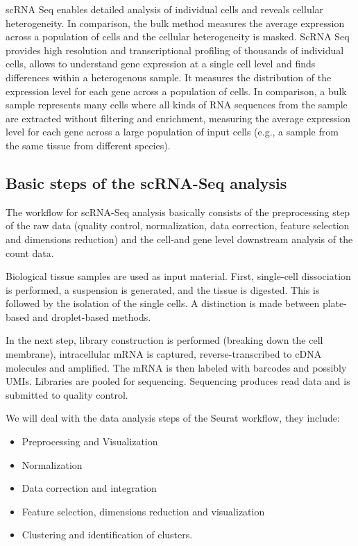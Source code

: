 \documentclass[a4paper, 10pt]{scrartcl}
\providecommand{\tightlist}{%
  \setlength{\itemsep}{0pt}\setlength{\parskip}{0pt}}
\begin{document}
scRNA Seq enables detailed analysis of individual cells and reveals
cellular heterogeneity. In comparison, the bulk method measures the
average expression across a population of cells and the cellular
heterogeneity is masked. ScRNA Seq provides high resolution and
transcriptional profiling of thousands of individual cells, allows to
understand gene expression at a single cell level and finds differences
within a heterogenous sample. It measures the distribution of the
expression level for each gene across a population of cells. In
comparison, a bulk sample represents many cells where all kinds of RNA
sequences from the sample are extracted without filtering and
enrichment, measuring the average expression level for each gene across
a large population of input cells (e.g., a sample from the same tissue
from different species).

\hypertarget{basic-steps-of-the-scrna-seq-analysis}{%
\subsection{Basic steps of the scRNA-Seq
analysis}\label{basic-steps-of-the-scrna-seq-analysis}}

The workflow for scRNA-Seq analysis basically consists of the
preprocessing step of the raw data (quality control, normalization, data
correction, feature selection and dimensions reduction) and the cell-and
gene level downstream analysis of the count data.

Biological tissue samples are used as input material. First, single-cell
dissociation is performed, a suspension is generated, and the tissue is
digested. This is followed by the isolation of the single cells. A
distinction is made between plate-based and droplet-based methods.

In the next step, library construction is performed (breaking down the
cell membrane), intracellular mRNA is captured, reverse-transcribed to
cDNA molecules and amplified. The mRNA is then labeled with barcodes and
possibly UMIs. Libraries are pooled for sequencing. Sequencing produces
read data and is submitted to quality control.

We will deal with the data analysis steps of the Seurat workflow, they
include:

\begin{itemize}
\tightlist
\item
  Preprocessing and Visualization
\item
  Normalization
\item
  Data correction and integration
\item
  Feature selection, dimensions reduction and visualization
\item
  Clustering and identification of clusters.
\end{itemize}
\end{document}
